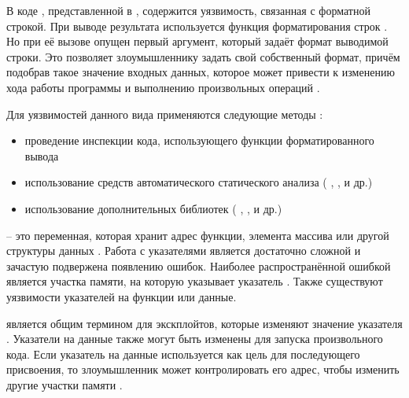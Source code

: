 %
В коде , представленной в , содержится уязвимость, связанная с форматной строкой.
%
При выводе результата используется функция форматирования строк . 
%
Но при её вызове опущен первый аргумент, который задаёт формат выводимой строки. 
%
Это позволяет злоумышленнику задать свой собственный формат, причём подобрав такое значение входных данных, которое может привести к изменению хода работы программы и выполнению произвольных операций 
. 

%
Для  уязвимостей данного вида применяются следующие методы  
: 
\begin{itemize}

	\item проведение инспекции кода, использующего функции форматированного вывода 
	
	\item использование средств автоматического статического анализа ( ,  ,   и др.) 
	
	\item использование дополнительных библиотек ( ,  ,   и др.) 
\end{itemize}



%
 -- это переменная, которая хранит адрес функции, элемента массива или другой структуры данных . 
%
Работа с указателями является достаточно сложной и зачастую подвержена появлению ошибок. 
%
Наиболее распространённой ошибкой является  участка памяти, на которую указывает указатель . 
%
Также существуют уязвимости указателей на функции или данные.

%
 является общим термином для экскплойтов, которые изменяют значение указателя . 
%
Указатели на данные также могут быть изменены для запуска произвольного кода. 
%
Если указатель на данные используется как цель для последующего присвоения, то злоумышленник может контролировать его адрес, чтобы изменить другие участки памяти . 

